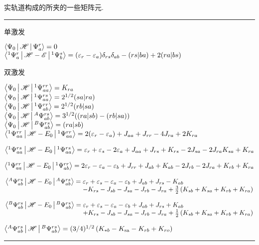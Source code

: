 \begin{table}[H]
		\caption{{实轨道构成的}所夹的一些矩阵元.}
		\hrule
		\vspace{5pt}
        单激发\par
        $\Braket{\Psi_0|\mathscr{H}|\Psi_{a}^{r}} = 0$\\
        $\Braket{^1\Psi_a^r|\mathscr{H}-\mathscr{E}|^1\Psi_b^s} = (\varepsilon_r-\varepsilon_a)\delta_{rs}\delta_{ab}-(rs|ba)+2(ra|bs)$
        \par
        \mbox{}\par
        双激发\par
        $\Braket{\Psi_0|\mathscr{H}|^1\Psi_{aa}^{rr}}  = K_{ra}$\\
        $\Braket{\Psi_0|\mathscr{H}|^1\Psi_{aa}^{rs}} = 2^{1/2}(sa|ra)$\\
        $\Braket{\Psi_0|\mathscr{H}|^1\Psi_{ab}^{rr}} = 2^{1/2}(rb|sa)$\\
        $\Braket{\Psi_0|\mathscr{H}|^A\Psi_{ab}^{rs}} = 3^{1/2}((ra|sb)-(rb|sa))$\\
        $\Braket{\Psi_0|\mathscr{H}|^B\Psi_{ab}^{rs}} = (ra|sb)$\\
        $\Braket{^1\Psi_{aa}^{rr}|\mathscr{H}-E_0|^1\Psi_{aa}^{rr}} = 2(\varepsilon_r-\varepsilon_a) + J_{aa} + J_{rr} -4J_{ra} + 2K_{ra}
        $\par
        $\Braket{^1\Psi_{aa}^{rs}|\mathscr{H}-E_0|^1\Psi_{aa}^{rs}} = \varepsilon_r+\varepsilon_s -2\varepsilon_{a}+ J_{aa} + J_{rs} +K_{rs} -2J_{sa} -2J_{ra} K_{sa} + K_{ra}
        $\par
        $\Braket{^1\Psi_{aa}^{rr}|\mathscr{H}-E_0|^1\Psi_{ab}^{rr}} = 2\varepsilon_r-\varepsilon_a -\varepsilon_{b}+ J_{rr} + J_{ab} +K_{ab} -2J_{rb} -2J_{ra} + K_{rb} + K_{ra}
        $\par
        $\arraycolsep=1.4pt
        \begin{array}[t]{ll}
        	\braket{^A\Psi_{ab}^{rs}|\hs-E_0|^A\Psi_{ab}^{rs}} = & \epsilon_{r}+\epsilon_{s}-\epsilon_{a}-\epsilon_{b}+J_{a b}+J_{r s}-K_{a b}                      \\
        	                                                     & -K_{r s}-J_{s b}-J_{s a}-J_{r b}-J_{r a}+\frac{3}{2}\left(K_{s b}+K_{s a}+K_{r b}+K_{r a}\right)
        \end{array}$\par
        $\arraycolsep=1.4pt
        \begin{array}[t]{ll}
        	\braket{^B\Psi_{ab}^{rs}|\hs-E_0|^B\Psi_{ab}^{rs}} = & \varepsilon_{r}+\varepsilon_{s}-\varepsilon_{a}-\varepsilon_{b}+J_{a b}+J_{r s}+K_{a b}          \\
        	                                                     & +K_{r s}-J_{s b}-J_{s a}-J_{r b}-J_{r a}+\frac{1}{2}\left(K_{s b}+K_{s a}+K_{r b}+K_{r a}\right)
        \end{array}$\par
        $\Braket{^A\Psi_{ab}^{rs}|\mathscr{H}|^B\Psi_{ab}^{rs}}=(3 / 4)^{1 / 2}\left(K_{* b}-K_{\mathrm{sa}}-K_{r b}+K_{r o}\right)$
        \vspace{5pt}
		\hrule
	\end{table}


